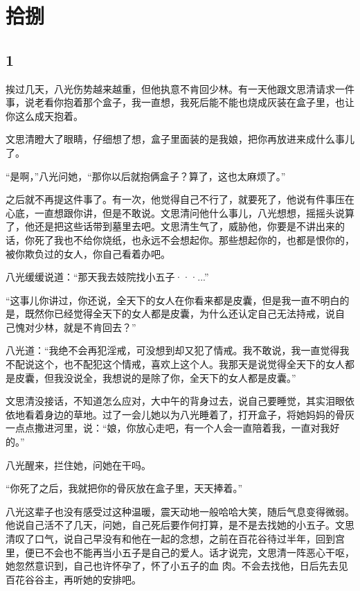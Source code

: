 \section{拾捌}

{\centering\subsection{1}}

挨过几天，八光伤势越来越重，但他执意不肯回少林。有一天他跟文思清请求一件事，说老看你抱着那个盒子，我一直想，我死后能不能也烧成灰装在盒子里，也让你这么成天抱着。

文思清瞪大了眼睛，仔细想了想，盒子里面装的是我娘，把你再放进来成什么事儿了。

“是啊，”八光问她，“那你以后就抱俩盒子？算了，这也太麻烦了。”

之后就不再提这件事了。有一次，他觉得自己不行了，就要死了，他说有件事压在心底，一直想跟你讲，但是不敢说。文思清问他什么事儿，八光想想，摇摇头说算了，他还是把这些话带到墓里去吧。文思清生气了，威胁他，你要是不讲出来的话，你死了我也不给你烧纸，也永远不会想起你。那些想起你的，也都是恨你的，被你欺负过的女人，你自己看着办吧。

八光缓缓说道：“那天我去妓院找小五子···...”

“这事儿你讲过，你还说，全天下的女人在你看来都是皮囊，但是我一直不明白的是，既然你已经觉得全天下的女人都是皮囊，为什么还认定自己无法持戒，说自
己愧对少林，就是不肯回去？”

八光道：“我绝不会再犯淫戒，可没想到却又犯了情戒。我不敢说，我一直觉得我不配说这个，也不配犯这个情戒，喜欢上这个人。我那天是说觉得全天下的女人都是皮囊，但我没说全，我想说的是除了你，全天下的女人都是皮囊。”

文思清没接话，不知道怎么应对，大中午的背身过去，说自己要睡觉，其实泪眼依依地看着身边的草地。过了一会儿她以为八光睡着了，打开盒子，将她妈妈的骨灰一点点撒进河里，说：“娘，你放心走吧，有一个人会一直陪着我，一直对我好的。”

八光醒来，拦住她，问她在干吗。

“你死了之后，我就把你的骨灰放在盒子里，天天捧着。”

八光这辈子也没有感受过这种温暖，震天动地一般哈哈大笑，随后气息变得微弱。他说自己活不了几天，问她，自己死后要作何打算，是不是去找她的小五子。文思清叹了口气，说自己早没有和他在一起的念想，之前在百花谷待过半年，回到宫里，便已不会也不能再当小五子是自己的爱人。话才说完，文思清一阵恶心干呕，她忽然意识到，自己也许怀孕了，怀了小五子的血
肉。不会去找他，日后先去见百花谷谷主，再听她的安排吧。

